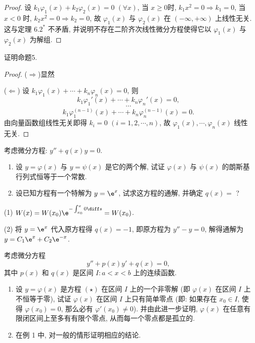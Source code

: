 \begin{proof} 
  设 $k_1\varphi_1(x)+k_2\varphi_2(x)=0$ $(\forall x)$, 当 $x\geq 0$时, $k_1x^2=0\Rightarrow k_1=0$, 
  当 $x<0$ 时, $k_2x^2=0\Rightarrow k_2=0$, 
  故 $\varphi_1(x)$ 与 $\varphi_2(x)$ 在 $(-\infty,+\infty)$ 上线性无关. 
  这与定理 $6.2^*$ 不矛盾, 并说明不存在二阶齐次线性微分方程使得它以 $\varphi_1(x)$ 与 $\varphi_2(x)$ 为解组.
\end{proof}



\begin{exercise}
  证明命题5.
\end{exercise}

\begin{proof} 
  ($\Rightarrow$)显然

  ($\Leftarrow$) 设 $k_1\varphi_1(x)+\cdots+k_n\varphi_n(x)=0$, 则
  \[k_1\varphi_1'(x)+\cdots+k_n\varphi_n'(x)=0,\]
  \[\cdots\]
  \[k_1\varphi_1^{(n-1)}(x)+\cdots+k_n\varphi_n^{(n-1)}(x)=0.\]
  由向量函数组线性无关即得 $k_i=0$ $(i=1,2,\cdots,n)$, 故 $\varphi_1(x),\cdots,\varphi_n(x)$ 线性无关.
\end{proof}



\begin{exercise}
  考虑微分方程: $y''+q(x)y=0$.
  \begin{enumerate}[(1)]
  \item 设 $y=\varphi(x)$ 与 $y=\psi(x)$ 是它的两个解, 
    试证 $\varphi(x)$ 与 $\psi(x)$ 的朗斯基行列式恒等于一个常数.
  \item 设已知方程有一个特解为 $y=\e^x$, 试求这方程的通解, 并确定 $q(x)=$ ?
  \end{enumerate}
\end{exercise}

\begin{solve}
  (1) $W(x)=W(x_0)\e^{-\int_{x_0}^x0\diff s}=W(x_0)$.

  (2) 将 $y=\e^x$ 代入原方程得 $q(x)=-1$, 即原方程为 $y''-y=0$, 解得通解为 $y=C_1\e^x+C_2\e^{-x}$.
\end{solve}



\begin{exercise}
  考虑微分方程
  \begin{equation}
    y''+p(x)y'+q(x)=0, \tag{$\star$}
  \end{equation}
  其中 $p(x)$ 和 $q(x)$ 是区间 $I:a<x<b$ 上的连续函数.
  \begin{enumerate}[(1)]
  \item 设 $y=\varphi(x)$ 是方程 $(\star)$ 在区间 $I$ 上的一个非零解
  (即 $\varphi(x)$ 在区间 $I$ 上不恒等于零), 
  试证 $\varphi(x)$ 在区间 $I$ 上只有简单零点
  (即: 如果存在 $x_0\in I$, 使得 $\varphi(x_0)=0$, 那么必有 $\varphi'(x_0)\neq 0$). 
  并由此进一步证明, $\varphi(x)$ 在任意有限闭区间上至多有有限个零点, 从而每一个零点都是孤立的.
  \item 在例 1 中, 对一般的情形证明相应的结论.
  \end{enumerate}
\end{exercise}

